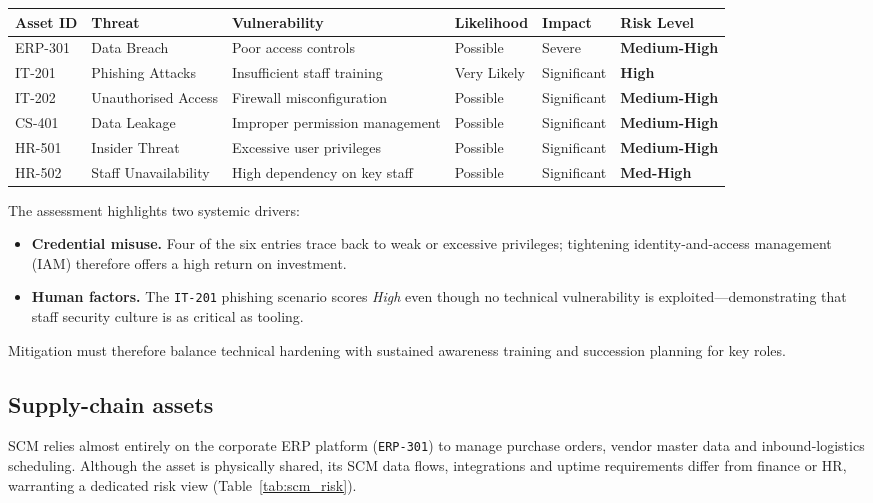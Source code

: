 \begin{longtable}{|p{2cm}|p{2.5cm}|p{3cm}|p{2cm}|p{2cm}|p{2cm}|}
  \hline
  \textbf{Asset ID} & \textbf{Threat} & \textbf{Vulnerability} & \textbf{Likelihood} & \textbf{Impact} & \textbf{Risk Level} \\
  \hline
  \endhead
  ERP-301 & Data Breach & Poor access controls & Possible & Severe & \textbf{Medium-High} \\
  \hline
  IT-201 & Phishing Attacks & Insufficient staff training & Very Likely & Significant & \textbf{High} \\
  \hline
  IT-202 & Unauthorised Access & Firewall misconfiguration & Possible & Significant & \textbf{Medium-High} \\
  \hline
  CS-401 & Data Leakage & Improper permission management & Possible & Significant & \textbf{Medium-High} \\
  \hline
  HR-501 & Insider Threat & Excessive user privileges & Possible & Significant & \textbf{Medium-High} \\
  \hline
  HR-502 & Staff Unavailability & High dependency on key staff & Possible & Significant & \textbf{Med-High} \\
  \hline
\end{longtable}

The assessment highlights two systemic drivers:

\begin{itemize}
  \item \textbf{Credential misuse.}  Four of the six entries trace back to weak or excessive privileges; tightening identity-and-access management (IAM) therefore offers a high return on investment.
  \item \textbf{Human factors.}  The \texttt{IT-201} phishing scenario scores \emph{High} even though no technical vulnerability is exploited—demonstrating that staff security culture is as critical as tooling.
\end{itemize}

Mitigation must therefore balance technical hardening with sustained awareness training and succession planning for key roles.

\subsection{Supply-chain assets}

SCM relies almost entirely on the corporate ERP platform (\texttt{ERP-301}) to manage purchase orders, vendor master data and inbound-logistics scheduling.  
Although the asset is physically shared, its SCM data flows, integrations and uptime requirements differ from finance or HR, warranting a dedicated risk view (Table~\ref{tab:scm_risk}).

